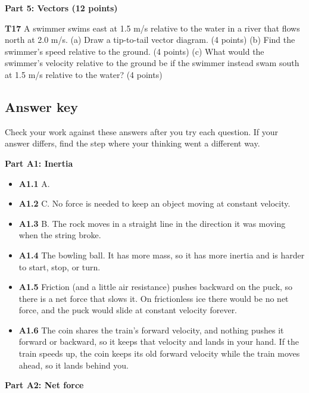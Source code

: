 \documentclass[
]{article}
\providecommand{\tightlist}{%
  \setlength{\itemsep}{0pt}\setlength{\parskip}{0pt}}
\begin{document}
\textbf{Part 5: Vectors (12 points)}

\textbf{T17} A swimmer swims east at 1.5 m/s relative to the water in a
river that flows north at 2.0 m/s. (a) Draw a tip-to-tail vector
diagram. (4 points) (b) Find the swimmer's speed relative to the ground.
(4 points) (c) What would the swimmer's velocity relative to the ground
be if the swimmer instead swam south at 1.5 m/s relative to the water?
(4 points)

\subsection{Answer key}\label{answer-key}

Check your work against these answers after you try each question. If
your answer differs, find the step where your thinking went a different
way.

\textbf{Part A1: Inertia}

\begin{itemize}
\tightlist
\item
  \textbf{A1.1} A.
\item
  \textbf{A1.2} C. No force is needed to keep an object moving at
  constant velocity.
\item
  \textbf{A1.3} B. The rock moves in a straight line in the direction it
  was moving when the string broke.
\item
  \textbf{A1.4} The bowling ball. It has more mass, so it has more
  inertia and is harder to start, stop, or turn.
\item
  \textbf{A1.5} Friction (and a little air resistance) pushes backward
  on the puck, so there is a net force that slows it. On frictionless
  ice there would be no net force, and the puck would slide at constant
  velocity forever.
\item
  \textbf{A1.6} The coin shares the train's forward velocity, and
  nothing pushes it forward or backward, so it keeps that velocity and
  lands in your hand. If the train speeds up, the coin keeps its old
  forward velocity while the train moves ahead, so it lands behind you.
\end{itemize}

\textbf{Part A2: Net force}
\end{document}
